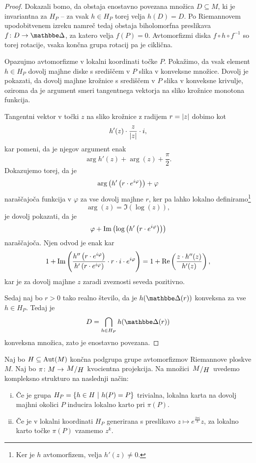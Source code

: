 \begin{proof}
Dokazali bomo, da obstaja enostavno povezana množica
$D \subseteq M$, ki je invariantna za $H_P$ -- za vsak $h \in H_P$
torej velja $h(D) = D$. Po Riemannovem upodobitvenem izreku namreč
tedaj obstaja biholomorfna preslikava $f \colon D \to \dsk$, za
katero velja $f(P) = 0$. Avtomorfizmi diska
$f \circ h \circ f^{-1}$ so torej rotacije, vsaka končna grupa
rotacij pa je ciklična.

Opazujmo avtomorfizme v lokalni koordinati točke $P$. Pokažimo, da
vsak element $h \in H_P$ dovolj majhne diske s središčem v $P$
slika v konveksne množice. Dovolj je pokazati, da dovolj majhne
krožnice s središčem v $P$ slika v konveksne krivulje, oziroma da
je argument smeri tangentnega vektorja na sliko krožnice monotona
funkcija.

Tangentni vektor v točki $z$ na sliko krožnice z radijem
$r = \left\lvert z\right\rvert$ dobimo kot
\[
h'(z) \cdot \frac{z}{\left\lvert z\right\rvert} \cdot i,
\]
kar pomeni, da je njegov argument enak
\[
\arg{h'(z)} + \arg(z) + \frac{\pi}{2}.
\]
Dokazujemo torej, da je
\[
\arg \left(h' \left(r \cdot e^{i \varphi}\right)\right) + \varphi
\]
naraščajoča funkcija v $\varphi$ za vse dovolj majhne $r$, ker pa
lahko lokalno definiramo\footnote{Ker je $h$ avtomorfizem, velja
$h'(z) \ne 0$.}
\[
\arg(z) = \Im(\log(z)),
\]
je dovolj pokazati, da je
\[
\varphi + \operatorname{Im} \left(\log \left(h' \left(r \cdot e^{i \varphi}\right)\right)\right)
\]
naraščajoča. Njen odvod je enak kar
\[
1 + \operatorname{Im} \left(\frac{h'' \left(r \cdot e^{i \varphi}\right)}
{h' \left(r \cdot e^{i \varphi}\right)} \cdot
r \cdot i \cdot e^{i \varphi}\right) =
1 + \operatorname{Re} \left(\frac{z \cdot h''(z)}{h'(z)}\right),
\]
kar je za dovolj majhne $z$ zaradi zveznosti seveda pozitivno.

Sedaj naj bo $r > 0$ tako realno število, da je
$h(\dsk(r))$ konveksna za vse $h \in H_P$. Tedaj je
\[
D = \bigcap_{h \in H_P} h(\dsk(r))
\]
konveksna množica, zato je enostavno povezana.
\end{proof}

\begin{definicija}
Naj bo $H \subseteq \operatorname{Aut}(M)$ končna podgrupa grupe avtomorfizmov
Riemannove ploskve $M$. Naj bo $\pi \colon M \to \kvoc{M}{H}$
kvocientna projekcija. Na množici $\kvoc{M}{H}$ uvedemo kompleksno
strukturo na naslednji način:

\begin{enumerate}[i)]
\item Če je grupa $H_P = \left\{h \in H~\middle\vert~h(P) = P\right\}$ trivialna,
lokalna karta na dovolj majhni okolici $P$ inducira lokalno karto
pri $\pi(P)$.
\item Če je v lokalni koordinati $H_P$ generirana s preslikavo
$z \mapsto e^{\frac{2 \pi i}{k}} z$, za lokalno karto točke
$\pi(P)$ vzamemo $z^k$.
\end{enumerate}
\end{definicija}


